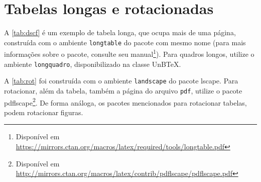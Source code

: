 \chapter{Tabelas longas e rotacionadas}\label{apd:tabs}

A \cref{tab:dscf} é um exemplo de tabela longa, que ocupa mais de uma página, construída com o ambiente \texttt{longtable} do pacote com mesmo nome (para mais informações sobre o pacote, consulte seu manual\footnote{Disponível em \url{https://mirrors.ctan.org/macros/latex/required/tools/longtable.pdf}}). Para quadros longos, utilize o ambiente \texttt{longquadro}, disponibilizado na classe UnB\TeX. 

A \cref{tab:rot} foi construída com o ambiente \texttt{landscape} do pacote \textsf{lscape}. Para rotacionar, além da tabela, também a página do arquivo \texttt{pdf}, utilize o pacote \textsf{pdflscape}\footnote{Disponível em \url{http://mirrors.ctan.org/macros/latex/contrib/pdflscape/pdflscape.pdf}}. De forma análoga, os pacotes mencionados para rotacionar tabelas, podem rotacionar figuras.

